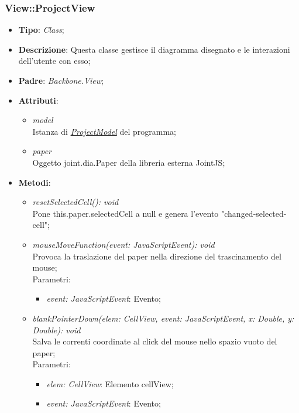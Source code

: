 \documentclass[../DefinizioneDiProdotto.tex]{subfiles}
\begin{document}
				\subsubsection{View::ProjectView}
					\hypertarget{SWEDesigner::Client::View::ProjectView}{}
					\begin{itemize}
						\item \textbf{Tipo}: \emph{Class};
						\item \textbf{Descrizione}: Questa classe gestisce il diagramma disegnato e le interazioni dell'utente con esso;
						\item \textbf{Padre}: \emph{Backbone.View};
						\item \textbf{Attributi}:
						\begin{itemize}
							\item \emph{model} \\
							Istanza di \hyperlink{SWEDesigner::Model::ProjectModel}{\emph{ProjectModel}} del programma;
							\item \emph{paper} \\
							Oggetto joint.dia.Paper della libreria esterna JointJS;
						\end{itemize}
						\item \textbf{Metodi}:
						\begin{itemize}
							\item \emph{resetSelectedCell(): void} \\
							Pone this.paper.selectedCell a null e genera l'evento "changed-selected-cell";
							\item \emph{mouseMoveFunction(event: JavaScriptEvent): void} \\
							Provoca la traslazione del paper nella direzione del trascinamento del mouse; \\
							Parametri:
							\begin{itemize}
								\item \emph{event: JavaScriptEvent}: Evento;
							\end{itemize}
							\item \emph{blankPointerDown(elem: CellView, event: JavaScriptEvent, x: Double, y: Double): void} \\
							Salva le correnti coordinate al click del mouse nello spazio vuoto del paper; \\
							Parametri:
							\begin{itemize}
								\item \emph{elem: CellView}: Elemento cellView;
								\item \emph{event: JavaScriptEvent}: Evento;

\end{itemize}
\end{itemize}
\end{itemize}
\end{document}
